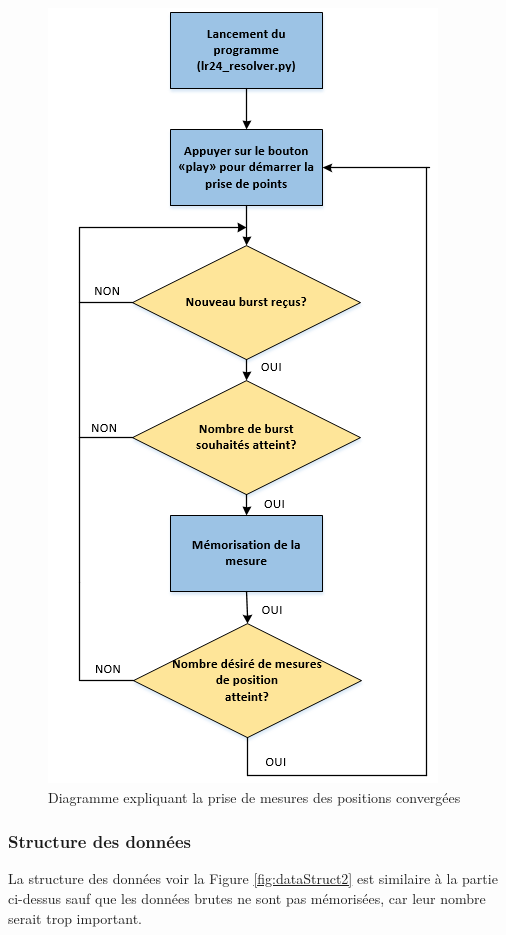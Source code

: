 \begin{figure}[htp]
 \begin{center}
  \includegraphics[scale=0.7]{figures/PriseMesures2.png}
  \caption{Diagramme expliquant la prise de mesures des positions convergées}
  \label{fig:mesures2} %
 \end{center}
\end{figure}

\subsubsection{Structure des données}
La structure des données voir la Figure \ref{fig:dataStruct2} est similaire à la partie ci-dessus sauf que les données brutes ne sont pas mémorisées, car leur nombre serait trop important. 

